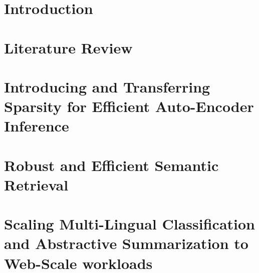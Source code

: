 \documentclass[draftthesis,tocnosub,noragright,centerchapter,fullpagesingle,12pt]{uiuc_csthesis21}
\numberwithin{algocf}{chapter}
\theoremstyle{definition}
\begin{document}
\chapter{Introduction}
\label{chp:intro}
 
\chapter{Literature Review}
\label{chp:lit}
 
\chapter{Introducing and Transferring Sparsity for Efficient Auto-Encoder Inference}
\label{chp:sparse}

\chapter{Robust and Efficient Semantic Retrieval}
\label{chp:search}

\chapter{Scaling Multi-Lingual Classification and Abstractive Summarization to Web-Scale workloads}
\label{chp:Multi}



\appendix
\label{chp:appendix}
 
\backmatter
\end{document}
